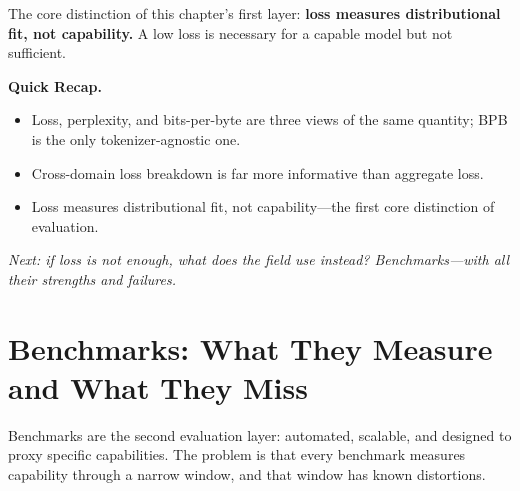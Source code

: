 The core distinction of this chapter's first layer: \textbf{loss measures distributional fit, not capability.} A low loss is necessary for a capable model but not sufficient.

\noindent{}

\begin{quickrecap}
\textbf{Quick Recap.}
\begin{itemize}[nosep,leftmargin=1.5em]
  \item Loss, perplexity, and bits-per-byte are three views of the same quantity; BPB is the only tokenizer-agnostic one.
  \item Cross-domain loss breakdown is far more informative than aggregate loss.
  \item Loss measures distributional fit, not capability---the first core distinction of evaluation.
\end{itemize}
\textit{Next: if loss is not enough, what does the field use instead? Benchmarks---with all their strengths and failures.}
\end{quickrecap}


\section{Benchmarks: What They Measure and What They Miss}
\label{sec:benchmarks}

Benchmarks are the second evaluation layer: automated, scalable, and designed to proxy specific capabilities. The problem is that every benchmark measures capability through a narrow window, and that window has known distortions.

